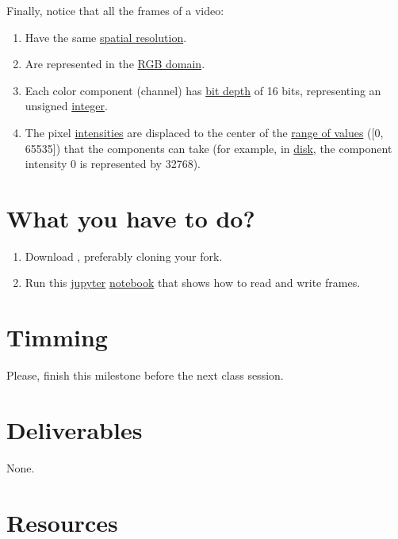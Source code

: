 Finally, notice that all the frames of a video:
\begin{enumerate}
\item Have the same
  \href{https://en.wikipedia.org/wiki/Image_resolution}{spatial
    resolution}.
\item Are represented in the
  \href{https://en.wikipedia.org/wiki/RGB_color_model}{RGB domain}.
\item Each color component (channel) has
  \href{https://en.wikipedia.org/wiki/Glossary_of_computer_graphics#bit_depth}{bit
    depth} of 16 bits, representing an unsigned
  \href{https://en.wikipedia.org/wiki/Integer_(computer_science)}{integer}.
\item The pixel
  \href{https://en.wikipedia.org/wiki/Luminous_intensity}{intensities}
  are displaced to the center of the
  \href{https://en.wikipedia.org/wiki/Range_(computer_programming)}{range
    of values} ([0, 65535]) that the components can take (for example,
  in \href{https://en.wikipedia.org/wiki/Disk_storage}{disk}, the
  component intensity 0 is represented by 32768).
\end{enumerate}
  
\section{What you have to do?}

\begin{enumerate}
\item Download \theproject{}, preferably cloning your fork.
\item Run this \href{https://jupyter.org/}{jupyter}
  \href{https://github.com/Sistemas-Multimedia/Sistemas-Multimedia.github.io/blob/master/study_guide/04-the_data/display_video.ipynb}{notebook}
  that shows how to read and write frames.
\end{enumerate}

\section{Timming}

Please, finish this milestone before the next class session.

\section{Deliverables}

None.

\section{Resources}


